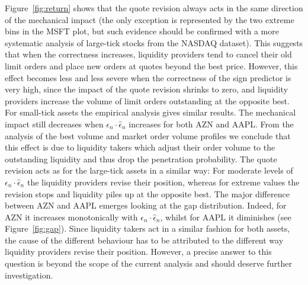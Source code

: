 \documentclass[12pt]{iopart}
\begin{document}
Figure~\ref{fig:return} shows that the quote revision always acts in the same direction of the mechanical impact (the only exception is represented by the two extreme bins in the MSFT plot, but such evidence should be confirmed with a more systematic analysis of large-tick stocks from the NASDAQ dataset). This suggests that when the correctness increases, liquidity providers tend to cancel their old limit orders and place new orders at quotes beyond the best price. However, this effect becomes less and less severe when the correctness of the sign predictor is very high, since the impact of the quote revision shrinks to zero, and liquidity providers increase the volume of limit orders outstanding at the opposite best. For small-tick assets the empirical analysis gives similar results. The mechanical impact still decreases when $\epsilon_n\cdot\hat{\epsilon}_n$ increases for both AZN and AAPL. From the analysis of the best volume and market order volume profiles we conclude that this effect is due to liquidity takers which adjust their order volume to the outstanding liquidity and thus drop the penetration probability. The quote revision acts as for the large-tick assets in a similar way: For moderate levels of $\epsilon_n\cdot\hat{\epsilon}_n$ the liquidity providers revise their position, whereas for extreme values the revision stops and liquidity piles up at the opposite best. The major difference between AZN and AAPL emerges looking at the gap distribution. Indeed, for AZN it increases monotonically with $\epsilon_n\cdot\hat{\epsilon}_n$, whilst for AAPL it diminishes (see Figure~\ref{fig:gap}). Since liquidity takers act in a similar fashion for both assets, the cause of the different behaviour has to be attributed to the different way liquidity providers revise their position. However, a precise answer to this question is beyond the scope of the current analysis and should deserve further investigation.
\end{document}
